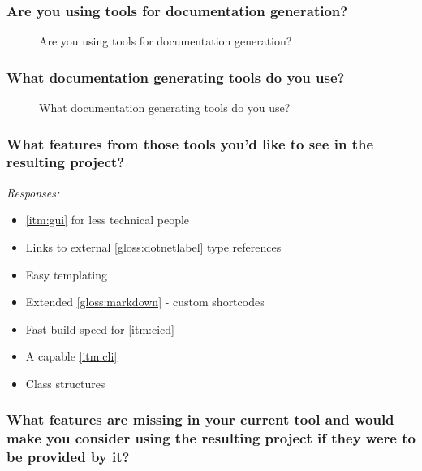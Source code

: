 \subsubsection*{Are you using tools for documentation generation?}

\begin{figure}[H]
    \centering
    \caption{Are you using tools for documentation generation?}
    \label{fig:qUsingToolsForDocGen}
\end{figure}

\subsubsection*{What documentation generating tools do you use?}

\begin{figure}[H]
    \centering
    \caption{What documentation generating tools do you use?}
\end{figure}

\subsubsection*{What features from those tools you'd like to see in the resulting project?}

\textit{Responses:}
\begin{itemize}
    \item \ref{itm:gui} for less technical people
    \item Links to external \ref{gloss:dotnetlabel} type references
    \item Easy templating
    \item Extended \ref{gloss:markdown} - custom shortcodes
    \item Fast build speed for \ref{itm:cicd}
    \item A capable \ref{itm:cli}
    \item Class structures
\end{itemize}

\subsubsection*{What features are missing in your current tool and would make you consider using the resulting project if they were to be provided by it?}

